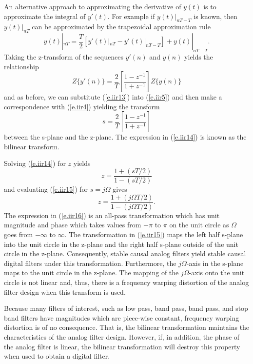 	An alternative approach to approximating the 
derivative of $y(t)$ is to approximate the integral of $y'(t)$.
For example if $y(t)|_{nT-T}$ is known, then $y(t)|_{nT}$ can
be approximated by the trapezoidal approximation rule
%
\begin{equation}
y(t)|_{nT}=\frac{T}{2}[y'(t)|_{nT}-y'(t)|_{nT-T}]+y(t)|_{nT-T}.
\label{e.iir12}
\end{equation}
%
Taking the z-transform of the sequences $y'(n)$ and $y(n)$
yields the relationship
%
\begin{equation}
Z\{y'(n)\}=\frac{2}{T}[\frac{1-z^{-1}}{1+z^{-1}}]Z\{y(n)\}
\label{e.iir13}
\end{equation}
%
and as before, we can substitute (\ref{e.iir13}) into (\ref{e.iir5}) and
then make a correspondence with (\ref{e.iir4}) yielding the
transform
%
\begin{equation}
s=\frac{2}{T}[\frac{1-z^{-1}}{1+z^{-1}}]
\label{e.iir14}
\end{equation}
%
between the s-plane and the z-plane.  The expression in (\ref{e.iir14}) is
known as the bilinear transform.

	Solving (\ref{e.iir14}) for $z$ yields
%
\begin{equation}
z=\frac{1+(sT/2)}{1-(sT/2)}
\label{e.iir15}
\end{equation}
%
and evaluating (\ref{e.iir15}) for $s=j\Omega$ gives
%
\begin{equation}
z=\frac{1+(j\Omega T/2)}{1-(j\Omega T/2)}.
\label{e.iir16}
\end{equation}
%
The expression in (\ref{e.iir16}) is an all-pass transformation
which has unit magnitude and phase which takes values from $-\pi$
to $\pi$ on the unit circle as $\Omega$ goes from $-\infty$ to
$\infty$.  The transformation in (\ref{e.iir15}) maps the left half
s-plane into the unit circle in the z-plane and
the right half s-plane outside of the unit circle
in the z-plane.  Consequently, stable causal analog filters
yield stable causal digital filters under this
transformation.  Furthermore, the $j\Omega$-axis in the
s-plane maps to the unit circle in the z-plane.
The mapping of the $j\Omega$-axis onto the unit circle is not linear
and, thus, there is a frequency warping distortion 
of the analog filter design when this 
transform is used.

	Because many filters of interest, such
as low pass, band pass, band pass, and stop band
filters have magnitudes which are piece-wise constant, frequency
warping distortion is of no consequence.  That is, the bilinear 
transformation maintains the characteristics of the
analog filter design.  However, if, in addition, the
phase of the analog filter is linear, the bilinear
transformation will destroy this property when used to obtain a
digital filter.
